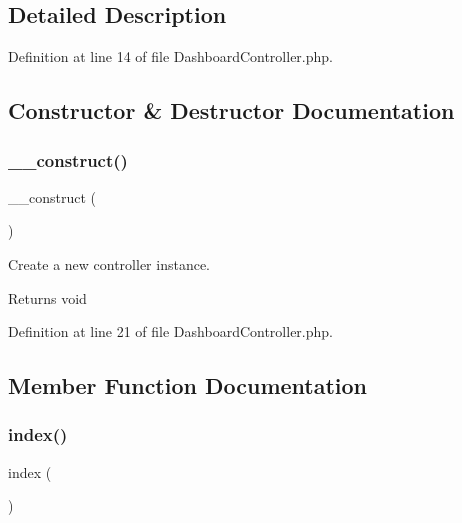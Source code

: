 \subsection{Detailed Description}


Definition at line 14 of file Dashboard\+Controller.\+php.



\subsection{Constructor \& Destructor Documentation}
\mbox{\label{class_responsive_1_1_http_1_1_controllers_1_1_dashboard_controller_a095c5d389db211932136b53f25f39685}} 
\subsubsection{\texorpdfstring{\_\_construct()}{\_\_construct()}}
{\footnotesize\ttfamily \+\_\+\+\_\+construct (\begin{DoxyParamCaption}{ }\end{DoxyParamCaption})}

Create a new controller instance.

\begin{DoxyReturn}{Returns}
void 
\end{DoxyReturn}


Definition at line 21 of file Dashboard\+Controller.\+php.



\subsection{Member Function Documentation}
\mbox{\label{class_responsive_1_1_http_1_1_controllers_1_1_dashboard_controller_a149eb92716c1084a935e04a8d95f7347}} 
\subsubsection{\texorpdfstring{index()}{index()}}
{\footnotesize\ttfamily index (\begin{DoxyParamCaption}{ }\end{DoxyParamCaption})}




